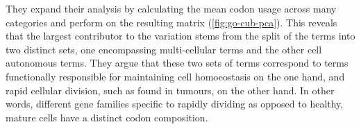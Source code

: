 They expand their analysis by calculating the mean codon usage across many \go
categories and perform \pca on the resulting matrix (\cref{fig:go-cub-pca}).
This reveals that the largest contributor to the variation stems from the split
of the \go terms into two distinct sets, one encompassing multi-cellular \go
terms and the other cell autonomous \go terms. They argue that these two sets of
\go terms correspond to \go terms functionally responsible for maintaining cell
homoeostasis on the one hand, and rapid cellular division, such as found in
tumours, on the other hand. In other words, different gene families specific to
rapidly dividing as opposed to healthy, mature cells have a distinct codon
composition.

